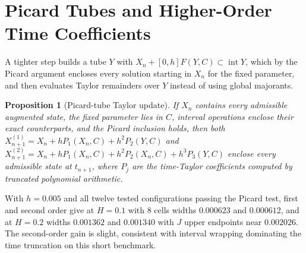 \documentclass[11pt,notitlepage]{report}
\newtheorem{proposition}[theorem]{Proposition}
\theoremstyle{definition}
\theoremstyle{remark}
\begin{document}
\section{Picard Tubes and Higher-Order Time Coefficients}
A tighter step builds a tube $Y$ with $X_n+[0,h]F(Y,C)\subset\operatorname{int}Y$, which by the Picard argument encloses every solution starting in $X_n$ for the fixed parameter, and then evaluates Taylor remainders over $Y$ instead of using global majorants.
\begin{proposition}[Picard-tube Taylor update]\label{prop:picardtaylor}
If $X_n$ contains every admissible augmented state, the fixed parameter lies in $C$, interval operations enclose their exact counterparts, and the Picard inclusion holds, then both
$X_{n+1}^{(1)}=X_n+hP_1(X_n,C)+h^2P_2(Y,C)$ and $X_{n+1}^{(2)}=X_n+hP_1(X_n,C)+h^2P_2(X_n,C)+h^3P_3(Y,C)$ enclose every admissible state at $t_{n+1}$, where $P_j$ are the time-Taylor coefficients computed by truncated polynomial arithmetic.
\end{proposition}
With $h=0.005$ and all twelve tested configurations passing the Picard test, first and second order give at $H=0.1$ with $8$ cells widths $0.000623$ and $0.000612$, and at $H=0.2$ widths $0.001362$ and $0.001340$ with $J$ upper endpoints near $0.002026$. The second-order gain is slight, consistent with interval wrapping dominating the time truncation on this short benchmark.
\end{document}
